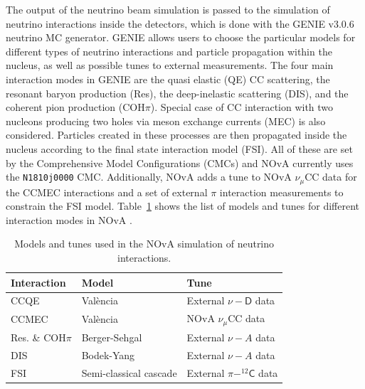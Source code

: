 
The output of the neutrino beam simulation is passed to the simulation of neutrino interactions inside the detectors, which is done with the GENIE v3.0.6~\cite{GENIE.pdf} neutrino MC generator. GENIE allows users to choose the particular models for different types of neutrino interactions and particle propagation within the nucleus, as well as possible tunes to external measurements. The four main interaction modes in GENIE are the quasi elastic (QE) CC scattering, the resonant baryon production (Res), the deep-inelastic scattering (DIS), and the coherent pion production (COH$\pi$). Special case of CC interaction with two nucleons producing two holes via meson exchange currents (MEC) is also considered. Particles created in these processes are then propagated inside the nucleus according to the final state interaction model (FSI). All of these are set by the Comprehensive Model Configurations (CMCs) and NOvA currently uses the \texttt{N1810j0000} CMC. Additionally, NOvA adds a tune to NOvA $\nu_\mu$CC data for the CCMEC interactions and a set of external $\pi$ interaction measurements to constrain the FSI model. Table~\ref{tab:NuIntSimulationModels} shows the list of models and tunes for different interaction modes in NOvA \cite{NOvAResults2021.pdf}.

\begin{table}[!ht]
\centering
\caption{Models and tunes used in the NOvA simulation of neutrino interactions.}
\begin{tabular}{|l|l|l|}
\hline
Interaction & Model                  & Tune\\\hline
CCQE & Val\`{e}ncia \cite{ValenciaModel_NOvACCQE_2004.pdf} & External $\nu-\textsf{D}$ data \cite{NuDeuteriumScattering_NOvACCQETune_2016.pdf}\\
CCMEC       & Val\`{e}ncia \cite{ValenciaModel_NOvACCQEMEC_2011.pdf,ValenciaModel_NOvAMEC_2013.pdf} & NOvA $\nu_\mu$CC data\\
Res. \& COH$\pi$ & Berger-Sehgal \cite{BergerSehgal_ResonancePionProd_2007.pdf,BergerSehgalModel_CohPionProd_2009.pdf}          & External $\nu-A$ data\\
DIS         & Bodek-Yang \cite{BodekYangModel_NOvADIS_2003.pdf,HadronizationModelForNuDIS_NOvADIS_1988.pdf}            & External $\nu-A$ data\\
FSI         & Semi-classical cascade \cite{FSIModel_hNSemiClassicalCascade_1988.pdf} & External $\pi-^{12}\textsf{C}$ data\\\hline
\end{tabular}
\label{tab:NuIntSimulationModels}
\end{table}

